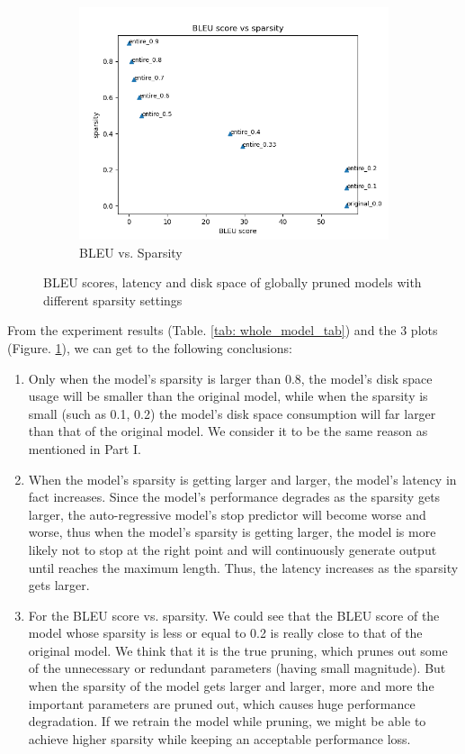 \documentclass[11pt]{article}
\begin{document}
\begin{figure}[h!]
    \centering
    \begin{subfigure}{0.5\textwidth}
        \includegraphics[width=\textwidth]{images/prun_whole_model/BLEU_vs_sparsity.png}
        \caption{BLEU vs. Sparsity}
    \end{subfigure}
    \caption{\label{fig:whole_model_prun_3fig}BLEU scores, latency and disk space of globally pruned models with different sparsity settings}
\end{figure}
From the experiment results (Table. \ref{tab: whole_model_tab}) and the 3 plots (Figure. \ref{fig:whole_model_prun_3fig}), we can get to the following conclusions:
\begin{enumerate}
    \item Only when the model’s sparsity is larger than 0.8, the model’s disk space usage will be smaller than the original model, while when the sparsity is small (such as 0.1, 0.2) the model’s disk space consumption will far larger than that of the original model. We consider it to be the same reason as mentioned in Part I.
    \item When the model’s sparsity is getting larger and larger, the model’s latency in fact increases. Since the model’s performance degrades as the sparsity gets larger, the auto-regressive model’s stop predictor will become worse and worse, thus when the model’s sparsity is getting larger, the model is more likely not to stop at the right point and will continuously generate output until reaches the maximum length. Thus, the latency increases as the sparsity gets larger.
    \item For the BLEU score vs. sparsity. We could see that the BLEU score of the model whose sparsity is less or equal to 0.2 is really close to that of the original model. We think that it is the true pruning, which prunes out some of the unnecessary or redundant parameters (having small magnitude). But when the sparsity of the model gets larger and larger, more and more the important parameters are pruned out, which causes huge performance degradation. If we retrain the model while pruning, we might be able to achieve higher sparsity while keeping an acceptable performance loss.
\end{enumerate}
\end{document}
